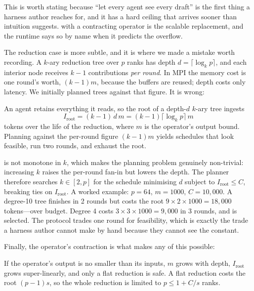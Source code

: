 This is worth stating because ``let every agent see every draft'' is the
first thing a harness author reaches for, and it has a hard ceiling that
arrives sooner than intuition suggests.  with a contracting
operator is the scalable replacement, and the runtime says so by name when
it predicts the overflow.

The reduction case is more subtle, and it is where we made a mistake worth
recording. A $k$-ary reduction tree over $p$ ranks has depth
$d=\lceil\log_k p\rceil$, and each interior node receives $k-1$
contributions \emph{per round}. In MPI the memory cost is one round's worth,
$(k-1)m$, because the buffers are reused; depth costs only latency. We
initially planned trees against that figure. It is wrong:

\begin{observation}
An agent retains everything it reads, so the root of a depth-$d$ $k$-ary
tree ingests
\begin{equation}
I_{\mathrm{root}} = (k-1)\,d\,m
= (k-1)\lceil\log_k p\rceil\, m
\label{eq:cumulative}
\end{equation}
tokens over the life of the reduction, where $m$ is the operator's output
bound. Planning against the per-round figure $(k-1)m$ yields schedules that
look feasible, run two rounds, and exhaust the root.
\end{observation}

 is not monotone in $k$, which makes the planning
problem genuinely non-trivial: increasing $k$ raises the per-round fan-in
but lowers the depth. The planner therefore searches $k \in [2,p]$ for the
schedule minimising $d$ subject to $I_{\mathrm{root}} \le C$, breaking ties
on $I_{\mathrm{root}}$. A worked example: $p=64$, $m=1000$, $C=10{,}000$. A
degree-10 tree finishes in 2 rounds but costs the root
$9 \times 2 \times 1000 = 18{,}000$ tokens---over budget. Degree 4 costs
$3 \times 3 \times 1000 = 9{,}000$ in 3 rounds, and is selected. The
protocol trades one round for feasibility, which is exactly the trade a
harness author cannot make by hand because they cannot see the constant.

Finally, the operator's contraction is what makes any of this possible:

\begin{observation}
If the operator's output is no smaller than its inputs, $m$ grows with
depth, $I_{\mathrm{root}}$ grows super-linearly, and only a flat reduction
is safe. A flat reduction costs the root $(p-1)s$, so the whole reduction is
limited to $p \le 1 + C/s$ ranks.
\end{observation}

